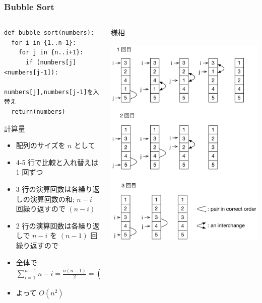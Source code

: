 \begin{frame}
\frametitle{Bubble Sort}
  \begin{columns}[t,onlytextwidth]
    \begin{column}{0.5\linewidth}
      \begin{lstlisting}[caption={擬似コード},label=bubble_sort]
def bubble_sort(numbers):
  for i in {1..n-1}:
    for j in {n..i+1}:
      if (numbers[j]<numbers[j-1]):
        numbers[j],numbers[j-1]を入替え
  return(numbers)  
      \end{lstlisting}
      \begin{itembox}[l]{計算量}
        \begin{itemize}
\tiny
\item 配列のサイズを $n$ として
\item 4-5 行で比較と入れ替えは 1 回ずつ
\item 3 行の演算回数は各繰り返しの演算回数の和; \(n-i\) 回繰り返すので \((n-i)\)
\item 2 行の演算回数は各繰り返しで \(n-i\) を \((n-1)\) 回繰り返すので
\item 全体で \(\sum_{i=1}^{n-1} n-i=\frac{n(n-1)}{2}=(\frac{n^2}{2}-\frac{n}{2})<n^2\)
\item よって \(O(n^2)\)
        \end{itemize}
      \end{itembox}
    \end{column}
    \begin{column}{0.55\linewidth}{様相}
      \begin{center}
\includegraphics[scale=0.3]{./Figure/bubble_sort.pdf}

\end{center}
\end{column}
\end{columns}
\end{frame}
